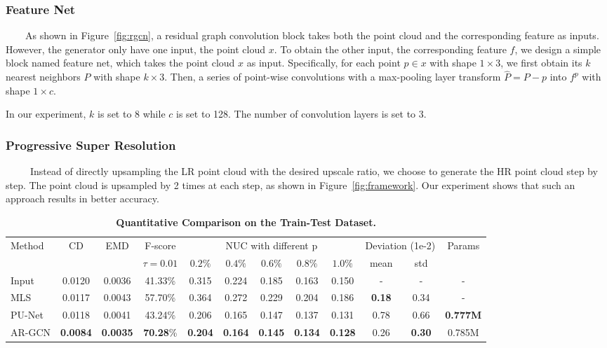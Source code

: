 \documentclass[10pt,twocolumn,letterpaper]{article}
\begin{document}
\subsubsection{Feature Net}
~~~~As shown in Figure~\ref{fig:rgcn}, a residual graph convolution block takes both the point cloud and the corresponding feature as inputs.
However, the generator only have one input, the point cloud $x$.
To obtain the other input, the corresponding feature $f$, we design a simple block named feature net, which takes the point cloud $x$ as input.
Specifically, for each point $p\in x$ with shape $1\times 3$, we first obtain its $k$ nearest neighbors $P$ with shape $k\times 3$.
Then, a series of point-wise convolutions with a max-pooling layer transform $\hat{P} = P - p$ into $f^p$ with shape $1\times c$.

In our experiment, $k$ is set to 8 while $c$ is set to 128.
The number of convolution layers is set to 3.

\subsubsection{Progressive Super Resolution}
~~~~~Instead of directly upsampling the LR point cloud with the desired upscale ratio, we choose to generate the HR point cloud step by step.
The point cloud is upsampled by 2 times at each step, as shown in Figure~\ref{fig:framework}.
Our experiment shows that such an approach results in better accuracy.

\begin{table*}[ht]
\small
\begin{center}
\begin{tabular}{l|cc|c|ccccc|cc|c}
\hline
\multirow{2}{*}{Method} & \multirow{2}{*}{CD} & \multirow{2}{*}{EMD} & \multicolumn{1}{c}{F-score} & \multicolumn{5}{|c}{NUC with different p} & \multicolumn{2}{|c|}{Deviation (1e-2)} & \multirow{2}{*}{Params}\\
\cline{4-11}
& & & $\tau=0.01$ & $0.2\%$ & $0.4\%$ & $0.6\%$ & $0.8\%$ & $1.0\%$ & mean & std \\
\hline
\hline
Input & 0.0120 & 0.0036 & 41.33\%  & 0.315 & 0.224 & 0.185 & 0.163 & 0.150 & - & - & -\\
MLS~\cite{alexa2003computing} & 0.0117 & 0.0043 & 57.70\% & 0.364 & 0.272 & 0.229 & 0.204 & 0.186 & \textbf{0.18} & 0.34 & -\\
PU-Net~\cite{yu2018pu} & 0.0118 & 0.0041 & 43.24\% & 0.206 & 0.165 & 0.147 & 0.137 & 0.131 & 0.78 & 0.66 & \textbf{0.777M}\\
\hline
AR-GCN & \textbf{0.0084} & \textbf{0.0035} & \textbf{70.28}\% & \textbf{0.204} & \textbf{0.164} & \textbf{0.145} & \textbf{0.134} & \textbf{0.128} & 0.26 & \textbf{0.30} & 0.785M\\
\hline
\end{tabular}
\end{center}
	\vspace{-1.5em}
	\caption{\textbf{Quantitative Comparison on the Train-Test Dataset.}}
	\label{table:pu_result}
\end{table*}
\end{document}
